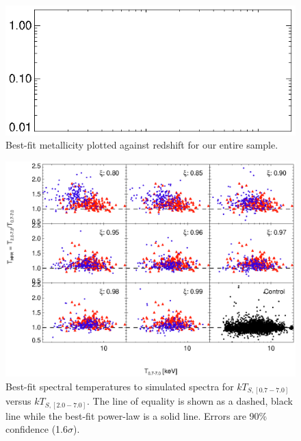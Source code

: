 \documentclass[12pt, preprint]{aastex}
\begin{document}
\begin{figure}[htp]
\begin{center}
\includegraphics[scale=1.0]{fe_z}
\caption{\small Best-fit metallicity plotted against redshift for our
entire sample.} 
\label{fig:fe_z}
\end{center}
\end{figure}

\begin{figure}[htp]
\begin{center}
\includegraphics[scale=1.0]{fak_tx}
\caption{\small Best-fit spectral temperatures to simulated spectra
for $kT_{S,[0.7-7.0]}$
versus $kT_{S,[2.0-7.0]}$. The line of equality is shown as a dashed,
black line while the best-fit power-law is a solid line. Errors
are 90\% confidence (1.6$\sigma$).}
\label{fig:fak_tx}
\end{center}
\end{figure}

\end{document}
